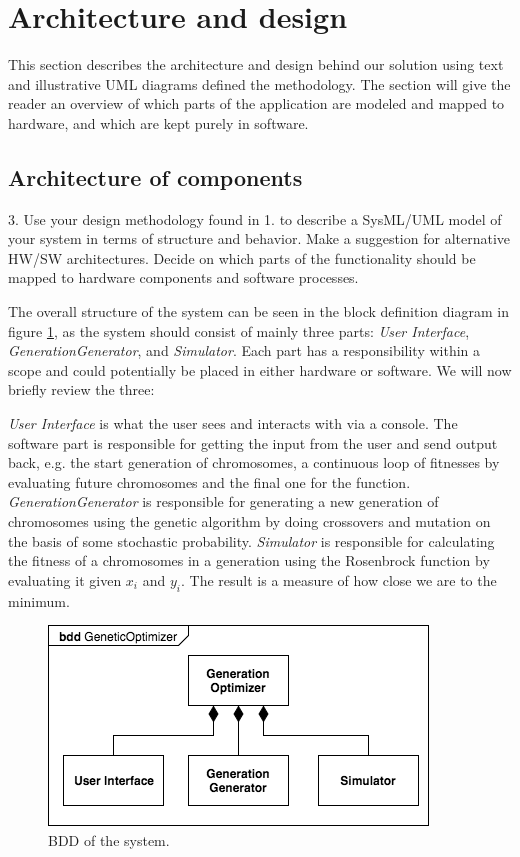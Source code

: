 \section{Architecture and design}\label{sec:archdesign}

This section describes the architecture and design behind our solution using text and illustrative UML diagrams defined the methodology. The section will give the reader an overview of which parts of the application are modeled and mapped to hardware, and which are kept purely in software.

\subsection{Architecture of components}
\begin{framed}
3. Use your design methodology found in 1. to describe a SysML/UML model of your system in terms of structure and behavior. Make a suggestion for alternative HW/SW architectures. Decide on which parts of the functionality should be mapped to hardware components and software processes.
\end{framed}

The overall structure of the system can be seen in the block definition diagram in figure \ref{fig:bdd}, as the system should consist of mainly three parts: \emph{User Interface}, \emph{GenerationGenerator}, and \emph{Simulator}. Each part has a responsibility within a scope and could potentially be placed in either hardware or software. We will now briefly review the three:

\emph{User Interface} is what the user sees and interacts with via a console. The software part is responsible for getting the input from the user and send output back, e.g. the start generation of chromosomes, a continuous loop of fitnesses by evaluating future chromosomes and the final one for the function.
\emph{GenerationGenerator} is responsible for generating a new generation of chromosomes using the genetic algorithm by doing crossovers and mutation on the basis of some stochastic probability.
\emph{Simulator} is responsible for calculating the fitness of a chromosomes in a generation using the Rosenbrock function by evaluating it given $x_{i}$ and $y_{i}$. The result is a measure of how close we are to the minimum.

\begin{figure}[htbp]
	\centering
	\includegraphics[width=0.7\linewidth]{../diagrams/bdd.png}
	\caption{BDD of the system.}
	\label{fig:bdd}
\end{figure}


